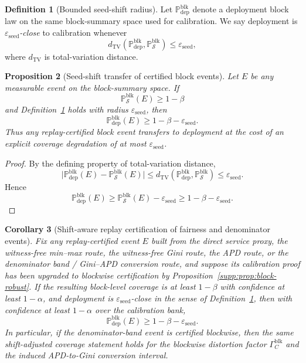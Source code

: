 \documentclass[11pt]{article}
\newcommand{\Prob}{\mathbb{P}}
\newcommand{\1}{\mathbf{1}}
\theoremstyle{definition}
\newtheorem{definition}{Definition}[section]
\theoremstyle{plain}
\newtheorem{proposition}[definition]{Proposition}
\newtheorem{corollary}[definition]{Corollary}
\theoremstyle{remark}
\begin{document}
\begin{definition}[Bounded seed-shift radius]
\label{supp:def:seed-shift}
Let $\Prob_{\mathrm{dep}}^{\mathrm{blk}}$ denote a deployment block law on the same block-summary space used for calibration. We say deployment is \emph{$\varepsilon_{\mathrm{seed}}$-close} to calibration whenever
\[
d_{\mathrm{TV}}\!\left(\Prob_{\mathrm{dep}}^{\mathrm{blk}},\Prob_{\mathcal S}^{\mathrm{blk}}\right)
\le
\varepsilon_{\mathrm{seed}},
\]
where $d_{\mathrm{TV}}$ is total-variation distance.
\end{definition}

\begin{proposition}[Seed-shift transfer of certified block events]
\label{supp:prop:seed-shift-transfer}
Let $E$ be any measurable event on the block-summary space. If
\[
\Prob_{\mathcal S}^{\mathrm{blk}}(E)\ge 1-\beta
\]
and Definition~\ref{supp:def:seed-shift} holds with radius $\varepsilon_{\mathrm{seed}}$, then
\[
\Prob_{\mathrm{dep}}^{\mathrm{blk}}(E)
\ge
1-\beta-\varepsilon_{\mathrm{seed}}.
\]
Thus any replay-certified block event transfers to deployment at the cost of an explicit coverage degradation of at most $\varepsilon_{\mathrm{seed}}$.
\end{proposition}

\begin{proof}
By the defining property of total-variation distance,
\[
\big|\Prob_{\mathrm{dep}}^{\mathrm{blk}}(E)-\Prob_{\mathcal S}^{\mathrm{blk}}(E)\big|
\le
 d_{\mathrm{TV}}\!\left(\Prob_{\mathrm{dep}}^{\mathrm{blk}},\Prob_{\mathcal S}^{\mathrm{blk}}\right)
\le
\varepsilon_{\mathrm{seed}}.
\]
Hence
\[
\Prob_{\mathrm{dep}}^{\mathrm{blk}}(E)
\ge
\Prob_{\mathcal S}^{\mathrm{blk}}(E)-\varepsilon_{\mathrm{seed}}
\ge
1-\beta-\varepsilon_{\mathrm{seed}}.
\]
\end{proof}

\begin{corollary}[Shift-aware replay certification of fairness and denominator events]
\label{supp:cor:shift-aware-replay}
Fix any replay-certified event $E$ built from the direct service proxy, the witness-free min--max route, the witness-free Gini route, the APD route, or the denominator band / Gini--APD conversion route, and suppose its calibration proof has been upgraded to blockwise certification by Proposition~\ref{supp:prop:block-robust}. If the resulting block-level coverage is at least $1-\beta$ with confidence at least $1-\alpha$, and deployment is $\varepsilon_{\mathrm{seed}}$-close in the sense of Definition~\ref{supp:def:seed-shift}, then with confidence at least $1-\alpha$ over the calibration bank,
\[
\Prob_{\mathrm{dep}}^{\mathrm{blk}}(E)
\ge
1-\beta-\varepsilon_{\mathrm{seed}}.
\]
In particular, if the denominator-band event is certified blockwise, then the same shift-adjusted coverage statement holds for the blockwise distortion factor $\Gamma_C^{\mathrm{blk}}$ and the induced APD-to-Gini conversion interval.
\end{corollary}
\end{document}
